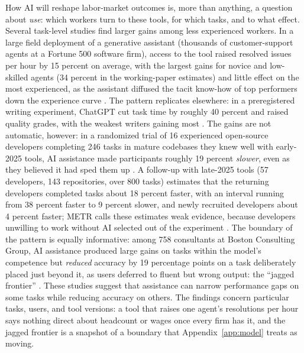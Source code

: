 \documentclass[12pt]{article}
\theoremstyle{plain}
\theoremstyle{definition}
\theoremstyle{remark}
\begin{document}
How AI will reshape labor-market outcomes is, more than anything, a question
about \emph{use}: which workers turn to these tools, for which tasks, and to
what effect. Several task-level studies find larger gains among less experienced
workers. In a large field deployment of a generative assistant (thousands of customer-support
agents at a Fortune 500 software firm), access to the tool raised resolved
issues per hour by 15 percent on average, with the largest gains for novice and
low-skilled agents (34 percent in the working-paper estimates) and little
effect on the most experienced, as the
assistant diffused the tacit know-how of top performers down the experience
curve \citep{BrynjolfssonLiRaymond2025QJE}. The
pattern replicates elsewhere: in a preregistered writing experiment, ChatGPT
cut task time by roughly 40 percent and raised quality grades, with the
weakest writers gaining most \citep{NoyZhang2023}. The gains
are not automatic, however: in a randomized trial of 16 experienced
open-source developers completing 246 tasks in mature codebases they
knew well with early-2025 tools, AI assistance made participants roughly
19 percent \emph{slower}, even as they believed it had sped them up
\citep{METR2025}. A follow-up with late-2025 tools (57 developers, 143
repositories, over 800 tasks) estimates that the returning developers
completed tasks about 18 percent faster, with an interval running from
38 percent faster to 9 percent slower, and newly recruited developers
about 4 percent faster; METR calls these estimates weak evidence, because
developers unwilling to work without AI selected out of the experiment
\citep{METR2026UpliftUpdate}. The
boundary of the pattern is equally informative: among 758 consultants at Boston
Consulting Group, AI assistance produced large gains on tasks within the
model's competence but \emph{reduced} accuracy by 19 percentage points on
a task deliberately placed just beyond it, as users deferred to fluent but
wrong output: the ``jagged frontier'' \citep{DellAcquaEtAl2023}. These studies suggest that assistance can narrow performance gaps on
some tasks while reducing accuracy on others. The findings concern
particular tasks, users, and tool versions: a
tool that raises one agent's resolutions per hour says nothing direct about
headcount or wages once every firm has it, and the jagged frontier is a
snapshot of a boundary that Appendix~\ref{app:model} treats as moving.
\end{document}
